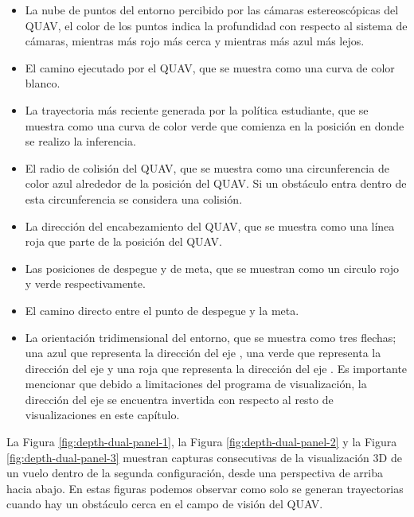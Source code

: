 \begin{itemize}
    \item La nube de puntos del entorno percibido por las cámaras estereoscópicas del QUAV, el color de los puntos indica la profundidad con respecto al sistema de cámaras, mientras más rojo más cerca y mientras más azul más lejos.
    \item El camino ejecutado por el QUAV, que se muestra como una curva de color blanco.
    \item La trayectoria más reciente generada por la política estudiante, que se muestra como una curva de color verde que comienza en la posición en donde se realizo la inferencia.
    \item El radio de colisión del QUAV, que se muestra como una circunferencia de color azul alrededor de la posición del QUAV. Si un obstáculo entra dentro de esta circunferencia se considera una colisión.
    \item La dirección del encabezamiento del QUAV, que se muestra como una línea roja que parte de la posición del QUAV.
    \item Las posiciones de despegue y de meta, que se muestran como un circulo rojo y verde respectivamente.
    \item El camino directo entre el punto de despegue y la meta.
    \item La orientación tridimensional del entorno, que se muestra como tres flechas; una azul que representa la dirección del eje , una verde que representa la dirección del eje  y una roja que representa la dirección del eje . Es importante mencionar que debido a limitaciones del programa de visualización, la dirección del eje  se encuentra invertida con respecto al resto de visualizaciones en este capítulo.
\end{itemize}

La Figura \ref{fig:depth-dual-panel-1}, la Figura \ref{fig:depth-dual-panel-2} y la Figura \ref{fig:depth-dual-panel-3} muestran capturas consecutivas de la visualización 3D de un vuelo dentro de la segunda configuración, desde una perspectiva de arriba hacia abajo. En estas figuras podemos observar como solo se generan trayectorias cuando hay un obstáculo cerca en el campo de visión del QUAV.

